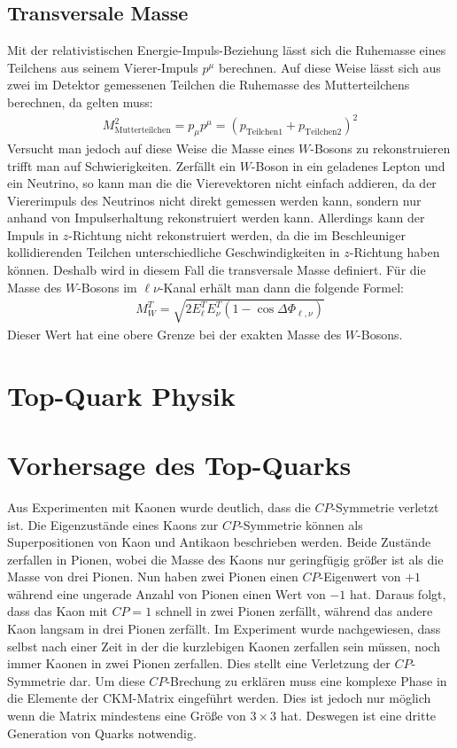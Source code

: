 \subsection{Transversale Masse}
Mit der relativistischen Energie-Impuls-Beziehung lässt sich die Ruhemasse eines Teilchens aus seinem Vierer-Impuls $p^\mu$ berechnen. Auf diese Weise lässt sich aus zwei im Detektor gemessenen Teilchen die Ruhemasse des Mutterteilchens berechnen, da gelten muss:
\begin{align*}
M_{\text{Mutterteilchen}}^2 = p_\mu p^\mu = (p_{\text{Teilchen} 1}+p_{\text{Teilchen} 2})^2
\end{align*}
Versucht man jedoch auf diese Weise die Masse eines $W$-Bosons zu rekonstruieren trifft man auf Schwierigkeiten. Zerfällt ein $W$-Boson in ein geladenes Lepton und ein Neutrino, so kann man die die Vierevektoren nicht einfach addieren, da der Viererimpuls des Neutrinos nicht direkt gemessen werden kann, sondern nur anhand von Impulserhaltung rekonstruiert werden kann. Allerdings kann der Impuls in $z$-Richtung nicht rekonstruiert werden, da die im Beschleuniger kollidierenden Teilchen unterschiedliche Geschwindigkeiten in $z$-Richtung haben können. Deshalb wird in diesem Fall die transversale Masse definiert. Für die Masse des $W$-Bosons im $\ell \nu$-Kanal erhält man dann die folgende Formel:
\begin{align*}
M_W^T = \sqrt{2E_{\ell}^TE_\nu^T\left(1-\cos \Delta\Phi_{\ell,\nu}\right)}
\end{align*}
Dieser Wert hat eine obere Grenze bei der exakten Masse des $W$-Bosons.

\section{Top-Quark Physik}
\section{Vorhersage des Top-Quarks}
Aus Experimenten mit Kaonen wurde deutlich, dass die $CP$-Symmetrie verletzt ist. Die Eigenzustände eines Kaons zur $CP$-Symmetrie können als Superpositionen von Kaon und Antikaon beschrieben werden. Beide Zustände zerfallen in Pionen, wobei die Masse des Kaons nur geringfügig größer ist als die Masse von drei Pionen. Nun haben zwei Pionen einen $CP$-Eigenwert von $+1$ während eine ungerade Anzahl von Pionen einen Wert von $-1$ hat. Daraus folgt, dass das Kaon mit $CP=1$ schnell in zwei Pionen zerfällt, während
 das andere Kaon langsam in drei Pionen zerfällt. Im Experiment wurde nachgewiesen, dass selbst nach einer Zeit in der die kurzlebigen Kaonen zerfallen sein müssen, noch immer Kaonen in zwei Pionen zerfallen. Dies stellt eine Verletzung der $CP$-Symmetrie dar. Um diese $CP$-Brechung zu erklären muss eine komplexe Phase in die Elemente der CKM-Matrix eingeführt werden. Dies ist jedoch nur möglich wenn die Matrix mindestens eine Größe von $3\times 3$ hat. Deswegen ist eine dritte Generation von Quarks notwendig.
 
